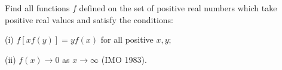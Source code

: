 Find all functions $f$ defined on the set of positive real numbers which take positive real values and satisfy the conditions:

(i) $f[xf(y)] = yf(x)$ for all positive $x, y$;

(ii) $f(x) \to 0$ as $x \to \infty$ (IMO 1983).

